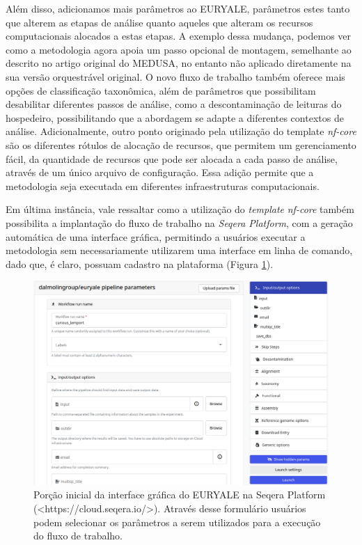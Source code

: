\documentclass[
	12pt,				%
	oneside,			%
	a4paper,			%
	chapter=TITLE,		%
	section=TITLE,		%
	english,			%
	brazil				%
	]{abntex2}
\begin{document}
Além disso, adicionamos mais parâmetros ao EURYALE, parâmetros estes tanto que alterem as etapas de análise quanto aqueles que alteram os recursos computacionais alocados a estas etapas. A exemplo dessa mudança, podemos ver como a metodologia agora apoia um passo opcional de montagem, semelhante ao descrito no artigo original do MEDUSA, no entanto não aplicado diretamente na sua versão orquestrável original. O novo fluxo de trabalho também oferece mais opções de classificação taxonômica, além de parâmetros que possibilitam desabilitar diferentes passos de análise, como a descontaminação de leituras do hospedeiro, possibilitando que a abordagem se adapte a diferentes contextos de análise. Adicionalmente, outro ponto originado pela utilização do template \emph{nf-core} são os diferentes rótulos de alocação de recursos, que permitem um gerenciamento fácil, da quantidade de recursos que pode ser alocada a cada passo de análise, através de um único arquivo de configuração. Essa adição permite que a metodologia seja executada em diferentes infraestruturas computacionais.

Em última instância, vale ressaltar como a utilização do \emph{template} \emph{nf-core} também possibilita a implantação do fluxo de trabalho na \emph{Seqera Platform}, com a geração automática de uma interface gráfica, permitindo a usuários executar a metodologia sem necessariamente utilizarem uma interface em linha de comando, dado que, é claro, possuam cadastro na plataforma (Figura \ref{fig:seqeraplat}).
\begin{figure}[H]

{\centering \includegraphics[width=0.7\linewidth]{figure/seqera_platform_example} 

}

\caption{Porção inicial da interface gráfica do EURYALE na Seqera Platform (<https://cloud.seqera.io/>). Através desse formulário usuários podem selecionar os parâmetros a serem utilizados para a execução do fluxo de trabalho.}\label{fig:seqeraplat}
\end{figure}
\end{document}
